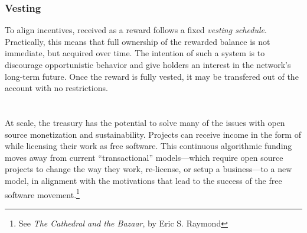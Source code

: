 \subsubsection{Vesting} To align incentives, \oscoin{} received
as a reward follows a fixed \emph{vesting schedule}. Practically, this means
that full ownership of the rewarded balance is not immediate, but acquired over time. The
intention of such a system is to discourage opportunistic behavior and give \oscoin{}
holders an interest in the network's long-term future. Once the reward is
fully vested, it may be transfered out of the account with no restrictions.
\label{s:vesting}

\section*{}

\noindent At scale, the \oscoin{} treasury has the potential to solve many of
the issues with open source monetization and sustainability. Projects can
receive income in the form of \oscoin{} while licensing their work as free
software. This continuous algorithmic funding moves
away from current ``transactional'' models---which require open source projects
to change the way they work, re-license, or setup a business---to a new model,
in alignment with the motivations that lead to the success of the free software
movement.\footnote{See \emph{The Cathedral and the Bazaar}, by Eric S. Raymond}
